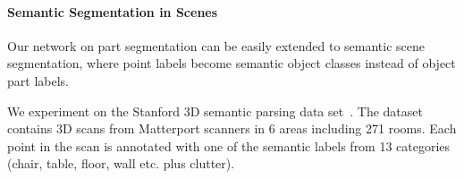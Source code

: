 \paragraph{Semantic Segmentation in Scenes} Our network on part segmentation can be easily extended to semantic scene segmentation, where point labels become semantic object classes instead of object part labels.



We experiment on the Stanford 3D semantic parsing data set~\cite{armeni_cvpr16}. The dataset contains 3D scans from Matterport scanners in 6 areas including 271 rooms. Each point in the scan is annotated with one of the semantic labels from 13 categories (chair, table, floor, wall etc. plus clutter).

